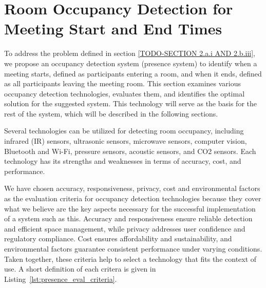\section{\label{sec:presence_intro}Room Occupancy Detection for Meeting Start and End Times}

To address the problem defined in section \ref{TODO-SECTION 2.a.i AND 2.b.iii}, we propose an occupancy detection system (presence system) to identify when a meeting starts, defined as participants entering a room, and when it ends, defined as all participants leaving the meeting room.
This section examines various occupancy detection technologies, evaluates them, and identifies the optimal solution for the suggested system.
This technology will serve as the basis for the rest of the system, which will be described in the following sections.

Several technologies can be utilized for detecting room occupancy, including infrared (IR) sensors\cite{woodward-2021}\cite{dodierBuildingOccupancyDetection2006}\cite{OccupancySensorMotion}, ultrasonic sensors\cite{woodward-2021}\cite{dodierBuildingOccupancyDetection2006}\cite{OccupancySensorMotion}, microwave sensors\cite{woodward-2021}, computer vision\cite{co2sensor}\cite{longoAccurateOccupancyEstimation2019}\cite{OccupancySensorMotion}, Bluetooth and Wi-Fi\cite{teissedre-2019}, pressure sensors\cite{OccupancySensorMotion}, acoustic sensors\cite{OccupancySensorMotion}, and CO2 sensors\cite{co2sensor}\cite{longoAccurateOccupancyEstimation2019}\cite{jinSensingProxyOccupancy2015}.\cite{faragherLocationFingerprintingBluetooth2015}
Each technology has its strengths and weaknesses in terms of accuracy, cost, and performance.

We have chosen accuracy, responsiveness, privacy, cost and environmental factors as the evaluation criteria for occupancy detection technologies because they cover what we believe are the key aspects necessary for the successful implementation of a system such as this.
Accuracy and responsiveness ensure reliable detection and efficient space management, while privacy addresses user confidence and regulatory compliance.
Cost ensures affordability and sustainability, and environmental factors guarantee consistent performance under varying conditions.
Taken together, these criteria help to select a technology that fits the context of use.
A short definition of each critera is given in Listing~\ref{lst:presence_eval_criteria}.

